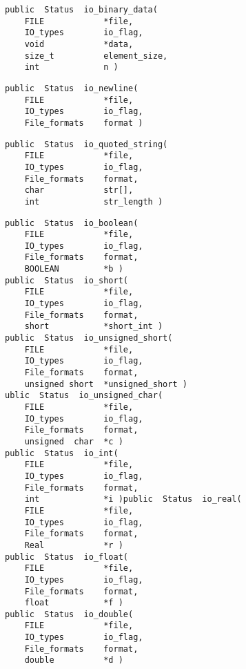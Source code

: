 
{\bf\begin{verbatim}
public  Status  io_binary_data(
    FILE            *file,
    IO_types        io_flag,
    void            *data,
    size_t          element_size,
    int             n )
\end{verbatim}}


{\bf\begin{verbatim}
public  Status  io_newline(
    FILE            *file,
    IO_types        io_flag,
    File_formats    format )
\end{verbatim}}


{\bf\begin{verbatim}
public  Status  io_quoted_string(
    FILE            *file,
    IO_types        io_flag,
    File_formats    format,
    char            str[],
    int             str_length )
\end{verbatim}}


{\bf\begin{verbatim}
public  Status  io_boolean(
    FILE            *file,
    IO_types        io_flag,
    File_formats    format,
    BOOLEAN         *b )
public  Status  io_short(
    FILE            *file,
    IO_types        io_flag,
    File_formats    format,
    short           *short_int )
public  Status  io_unsigned_short(
    FILE            *file,
    IO_types        io_flag,
    File_formats    format,
    unsigned short  *unsigned_short )
ublic  Status  io_unsigned_char(
    FILE            *file,
    IO_types        io_flag,
    File_formats    format,
    unsigned  char  *c )
public  Status  io_int(
    FILE            *file,
    IO_types        io_flag,
    File_formats    format,
    int             *i )public  Status  io_real(
    FILE            *file,
    IO_types        io_flag,
    File_formats    format,
    Real            *r )
public  Status  io_float(
    FILE            *file,
    IO_types        io_flag,
    File_formats    format,
    float           *f )
public  Status  io_double(
    FILE            *file,
    IO_types        io_flag,
    File_formats    format,
    double          *d )
\end{verbatim}}

